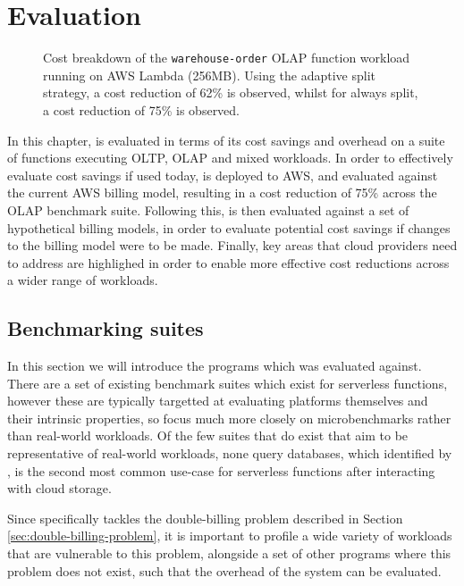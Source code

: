 \chapter{Evaluation}
\label{sec:evaluation}
\begin{figure}
    \begin{center}
        
    \end{center}
    \caption{Cost breakdown of the \texttt{warehouse-order} OLAP function workload running on AWS Lambda (256MB). Using the adaptive split strategy, a cost reduction of 62\% is observed, whilst for always split, a cost reduction of 75\% is observed.}
\end{figure}

In this chapter, \faaas{} is evaluated in terms of its cost savings and overhead on a suite of \faas{} functions executing OLTP, OLAP and mixed workloads. In order to effectively evaluate cost savings if used today, \faas{} is deployed to AWS, and evaluated against the current AWS billing model, resulting in a cost reduction of 75\% across the OLAP benchmark suite. Following this, \faaas{} is then evaluated against a set of hypothetical billing models, in order to evaluate potential cost savings if changes to the billing model were to be made. Finally, key areas that cloud providers need to address are highlighed in order to enable more effective cost reductions across a wider range of \faas{} workloads.

\section{Benchmarking suites}
In this section we will introduce the programs which \faaas{} was evaluated against. There are a set of existing benchmark suites which exist for serverless functions, however these are typically targetted at evaluating \faas{} platforms themselves and their intrinsic properties, so focus much more closely on microbenchmarks rather than real-world workloads. Of the few suites that do exist that aim to be representative of real-world workloads, none query databases, which identified by \cite{eismannReviewServerlessUse2020}, is the second most common use-case for serverless functions after interacting with cloud storage.

Since \faaas{} specifically tackles the double-billing problem described in Section \ref{sec:double-billing-problem}, it is important to profile a wide variety of workloads that are vulnerable to this problem, alongside a set of other programs where this problem does not exist, such that the overhead of the system can be evaluated.

